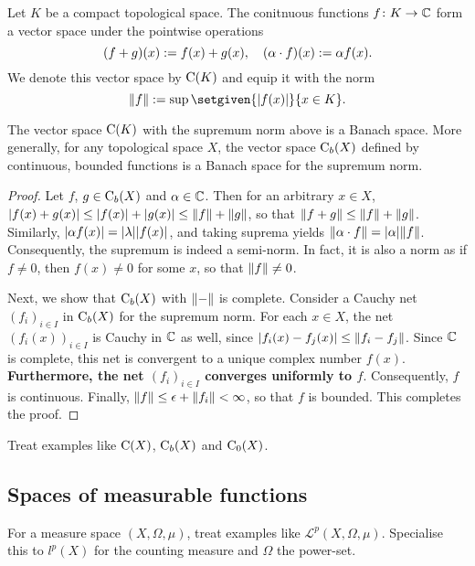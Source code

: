 Let \(K\) be a compact topological space. The conitnuous functions \(f \colon K \to \mathbb C\) form a  vector space under the pointwise operations \[(f + g)(x) \mathrel{:=} f(x) + g(x), \quad (\alpha \cdot f)(x) \mathrel{:=} \alpha f(x).\] We denote this vector space by \(\mathrm{C}(K)\) and equip it with the norm \[\norm{f} \defeq \sup \setgiven{\abs{f(x)}}{x \in K}.\]  

\begin{proposition}\label{prop:cont-compact}
The vector space \(\mathrm{C}(K)\) with the supremum norm above is a Banach space. More generally, for any topological space \(X\), the vector space \(\mathrm{C}_b(X)\) defined by continuous, bounded functions is a Banach space for the supremum norm. 
\end{proposition}

\begin{proof}
Let \(f\), \(g \in \mathrm{C}_b(X)\) and \(\alpha \in \mathbb C\). Then for an arbitrary \(x \in X\),  \(\lvert f(x) + g(x)\rvert \leq \lvert f(x)\rvert + \lvert g(x)\rvert \leq \lVert f\rVert + \lVert g\rVert\), so that \(\lVert f + g\rVert \leq \lVert f\rVert + \lVert g\rVert\). Similarly, \(\lvert\alpha f(x)\rvert = \lvert\lambda\rvert \lvert f(x)\rvert\), and taking suprema yields \(\lVert\alpha \cdot f\rVert = \lvert\alpha\rvert \lVert f\rVert\). Consequently, the supremum is indeed a semi-norm. In fact, it is also a norm as if \(f \neq 0\), then \(f(x) \neq 0\) for some \(x\), so that \(\lVert f\rVert \neq 0\). 

Next, we show that \(\mathrm{C}_b(X)\) with \(\lVert-\rVert\) is complete. Consider a Cauchy net \((f_i)_{i \in I}\) in \(\mathrm{C}_b(X)\) for the supremum norm. For each \(x \in X\), the net \((f_i(x))_{i \in I}\) is Cauchy in \(\mathbb C\) as well, since \(\lvert f_i(x) - f_j(x)\rvert \leq \lVert f_i - f_j\rVert\). Since \(\mathbb C\) is complete, this net is convergent to a unique complex number \(f(x)\). \textbf{Furthermore, the net \((f_i)_{i \in I}\) converges uniformly to \(f\)}. Consequently, \(f\) is continuous. Finally, \(\lVert f\rVert \leq \epsilon + \lVert f_i\rVert < \infty\), so that \(f\) is bounded. This completes the proof.  
\end{proof}

  Treat examples like \(\mathrm{C}(X)\), \(\mathrm{C}_b(X)\) and \(\mathrm{C}_0(X)\). 

\subsection{Spaces of measurable functions}

For a measure space \((X,\Omega, \mu)\), treat examples like \(\mathcal{L}^p(X,\Omega,\mu)\). Specialise this to \(l^p(X)\) for the counting measure and \(\Omega\) the power-set. 

